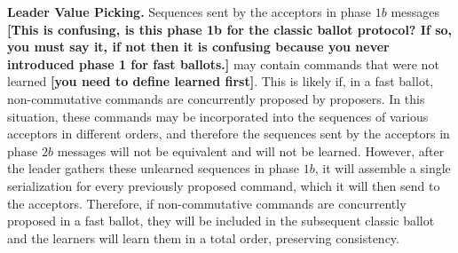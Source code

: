 \noindent \textbf{Leader Value Picking.} Sequences sent by the acceptors in phase $1b$ messages {\bf [This is confusing, is this phase 1b for the classic ballot protocol? If so, you must say it, if not then it is confusing because you never introduced phase 1 for fast ballots.]} may contain commands that were not learned {\bf [you need to define learned first]}. This is likely if, in a fast ballot, non-commutative commands are  concurrently proposed by proposers. In this situation, these commands may be incorporated into the sequences of various acceptors in different orders, and therefore the sequences sent by the acceptors in phase $2b$ messages will not be equivalent and will not be learned. However, after the leader gathers these unlearned sequences in phase $1b$, it will assemble a single serialization for every previously proposed command, which it will then send to the acceptors. Therefore, if non-commutative commands are concurrently proposed in a fast ballot, they will be included in the subsequent classic ballot and the learners will learn them in a total order, preserving consistency.

\iffalse 
\subsection{Optimization: Integration with view changes}

{\bf [Just a paste of two previous paragraphs -- need to organize this subsection]}

 This first phase becomes unnecessary when a classic ballot is executed after a view change, since the view change protocol can include this first phase, i.e., it can gather previously committed sequences and extract that same promise from the acceptors. In this case, the aforementioned promise is implicitly valid because, for the remainder of the current view, the leader is the only process that can start a new ballot.

 Note that there is a subtle interplay between the two types of ballots, since the leader must execute the first phase if he wishes to run a classic ballot after a fast ballot. This is because the acceptors may have used a fast round to vote for new sequences that are unknown to the leader, since they were proposed directly by the proposers.
\fi

